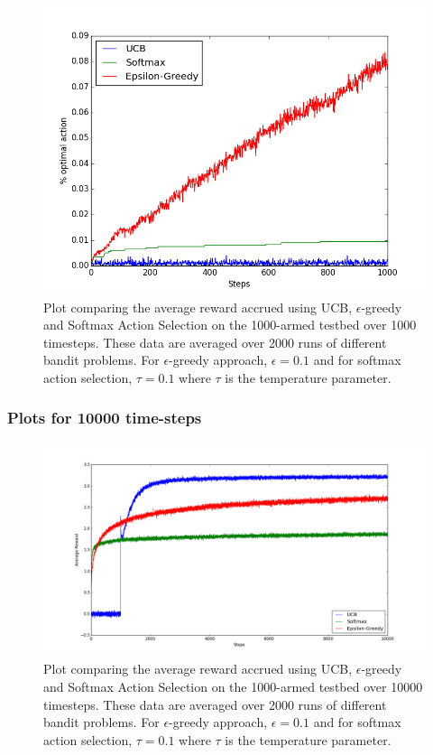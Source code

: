 \documentclass[english]{article}
\begin{document}
\begin{figure}[H]
  \includegraphics[width=\linewidth]{compare_ucb_1000_arms_1000_steps_optimal_action.png}
  \caption{Plot comparing the average reward accrued using UCB, $\epsilon$-greedy and Softmax Action Selection on the 1000-armed testbed over 1000 timesteps. These data are averaged over 2000 runs of different bandit problems. For $\epsilon$-greedy approach, $\epsilon = 0.1 $ and for softmax action selection, $\tau = 0.1$ where $\tau$ is the temperature parameter.}
  \label{fig:eg1}
\end{figure}

\subsubsection{Plots for 10000 time-steps}
\begin{figure}[H]
  \includegraphics[width=\linewidth]{compare_ucb_1000_arms_10000_steps_average_reward.png}
  \caption{Plot comparing the average reward accrued using UCB, $\epsilon$-greedy and Softmax Action Selection on the 1000-armed testbed over 10000 timesteps. These data are averaged over 2000 runs of different bandit problems. For $\epsilon$-greedy approach, $\epsilon = 0.1 $ and for softmax action selection, $\tau = 0.1$ where $\tau$ is the temperature parameter.}
  \label{fig:eg1}
\end{figure}
\end{document}
